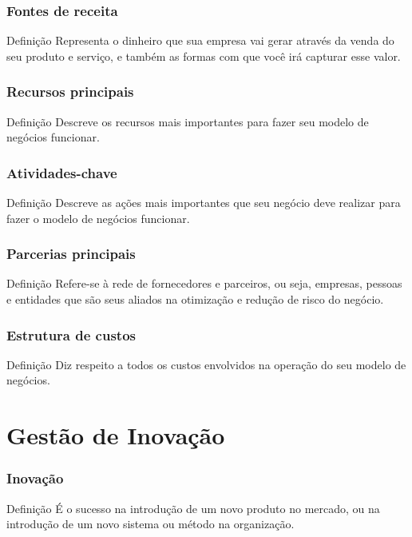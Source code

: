 \documentclass[aspectratio=169]{beamer}
\begin{document}
\begin{frame}
	\frametitle{Fontes de receita}

	\begin{block}{Defini\c cão}
		 Representa o dinheiro que sua empresa vai gerar através da venda do seu produto e serviço, e também as formas com que você irá capturar esse valor.
	\end{block}
\end{frame}

\begin{frame}
	\frametitle{Recursos principais}

	\begin{block}{Defini\c cão}
		 Descreve os recursos mais importantes para fazer seu modelo de negócios funcionar.
	\end{block}
\end{frame}

\begin{frame}
	\frametitle{Atividades-chave}

	\begin{block}{Defini\c cão}
		 Descreve as ações mais importantes que seu negócio deve realizar para fazer o modelo de negócios funcionar.
	\end{block}
\end{frame}

\begin{frame}
	\frametitle{Parcerias principais}

	\begin{block}{Defini\c cão}
		 Refere-se à rede de fornecedores e parceiros, ou seja, empresas, pessoas e entidades que são seus aliados na otimização e redução de risco do negócio.
	\end{block}
\end{frame}

\begin{frame}
	\frametitle{Estrutura de custos}

	\begin{block}{Defini\c cão}
		 Diz respeito a todos os custos envolvidos na operação do seu modelo de negócios.
	\end{block}
\end{frame}

\section{Gestão de Inova\c cão}

\begin{frame}
	\frametitle{Inova\c cão}

	\begin{block}{Defini\c cão}
		 É o sucesso na introdu\c cão de um novo produto no mercado, ou na introdu\c cão de um novo sistema ou método na organiza\c cão.
	\end{block}
\end{frame}
\end{document}
